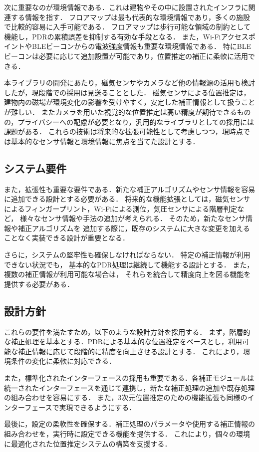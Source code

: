 次に重要なのが環境情報である．これは建物やその中に設置されたインフラに関連する情報を指す．
フロアマップは最も代表的な環境情報であり，多くの施設で比較的容易に入手可能である．
フロアマップは歩行可能な領域の制約として機能し，PDRの累積誤差を抑制する有効な手段となる．
また，Wi-FiアクセスポイントやBLEビーコンからの電波強度情報も重要な環境情報である．
特にBLEビーコンは必要に応じて追加設置が可能であり，位置推定の補正に柔軟に活用できる．

本ライブラリの開発にあたり，磁気センサやカメラなど他の情報源の活用も検討したが，現段階での採用は見送ることとした．
磁気センサによる位置推定は，建物内の磁場が環境変化の影響を受けやすく，安定した補正情報として扱うことが難しい．
またカメラを用いた視覚的な位置推定は高い精度が期待できるものの，プライバシーへの配慮が必要となり，汎用的なライブラリとしての採用には課題がある．
これらの技術は将来的な拡張可能性として考慮しつつ，現時点では基本的なセンサ情報と環境情報に焦点を当てた設計とする．

\subsection{システム要件}

また，拡張性も重要な要件である．新たな補正アルゴリズムやセンサ情報を容易に追加できる設計とする必要がある．
将来的な機能拡張としては，磁気センサによるフィンガープリント，Wi-Fiによる測位，気圧センサによる階層判定など，
様々なセンサ情報や手法の追加が考えられる．
そのため，新たなセンサ情報や補正アルゴリズムを
追加する際に，既存のシステムに大きな変更を加えることなく実装できる設計が重要となる．

さらに，システムの堅牢性も確保しなければならない．
特定の補正情報が利用できない状況でも，
基本的なPDR処理は継続して機能する設計とする．
また，複数の補正情報が利用可能な場合は，
それらを統合して精度向上を図る機能を提供する必要がある．

\subsection{設計方針}

これらの要件を満たすため，以下のような設計方針を採用する．
まず，階層的な補正処理を基本とする．PDRによる基本的な位置推定をベースとし，利用可能な補正情報に応じて段階的に精度を向上させる設計とする．
これにより，環境条件の変化に柔軟に対応できる．

また，標準化されたインターフェースの採用も重要である．各補正モジュールは統一されたインターフェースを通じて連携し，新たな補正処理の追加や既存処理の組み合わせを容易にする．
また，3次元位置推定のための機能拡張も同様のインターフェースで実現できるようにする．

最後に，設定の柔軟性を確保する．補正処理のパラメータや使用する補正情報の組み合わせを，実行時に設定できる機能を提供する．
これにより，個々の環境に最適化された位置推定システムの構築を支援する．

